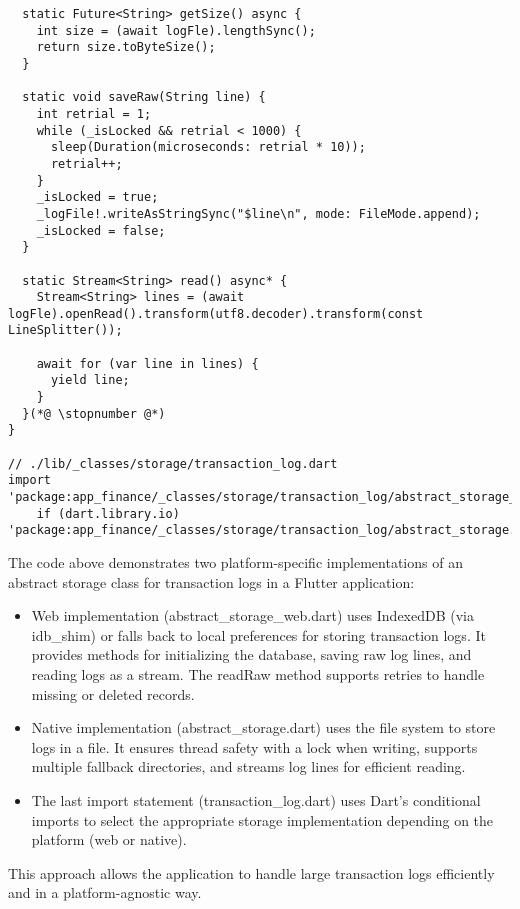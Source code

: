 \begin{lstlisting}
  static Future<String> getSize() async {
    int size = (await logFle).lengthSync();
    return size.toByteSize();
  }

  static void saveRaw(String line) {
    int retrial = 1;
    while (_isLocked && retrial < 1000) {
      sleep(Duration(microseconds: retrial * 10));
      retrial++;
    }
    _isLocked = true;
    _logFile!.writeAsStringSync("$line\n", mode: FileMode.append);
    _isLocked = false;
  }

  static Stream<String> read() async* {
    Stream<String> lines = (await logFle).openRead().transform(utf8.decoder).transform(const LineSplitter());

    await for (var line in lines) {
      yield line;
    }
  }(*@ \stopnumber @*)
}

// ./lib/_classes/storage/transaction_log.dart
import 'package:app_finance/_classes/storage/transaction_log/abstract_storage_web.dart'
    if (dart.library.io) 'package:app_finance/_classes/storage/transaction_log/abstract_storage.dart';
\end{lstlisting}

\noindent The code above demonstrates two platform-specific implementations of an abstract storage class for transaction 
logs in a Flutter application:

\begin{itemize}
\setlength{\itemsep}{3pt}
\setlength{\parskip}{0pt}
\setlength{\parsep}{0pt}
    \item Web implementation (abstract\_storage\_web.dart) uses IndexedDB (via idb\_shim) or falls back to local 
    preferences for storing transaction logs. It provides methods for initializing the database, saving raw log lines, 
    and reading logs as a stream. The readRaw method supports retries to handle missing or deleted records.

    \item Native implementation (abstract\_storage.dart) uses the file system to store logs in a file. It ensures thread 
    safety with a lock when writing, supports multiple fallback directories, and streams log lines for efficient reading.

    \item The last import statement (transaction\_log.dart) uses Dart's conditional imports to select the appropriate 
    storage implementation depending on the platform (web or native).
\end{itemize}

\noindent This approach allows the application to handle large transaction logs efficiently and in a platform-agnostic 
way.


